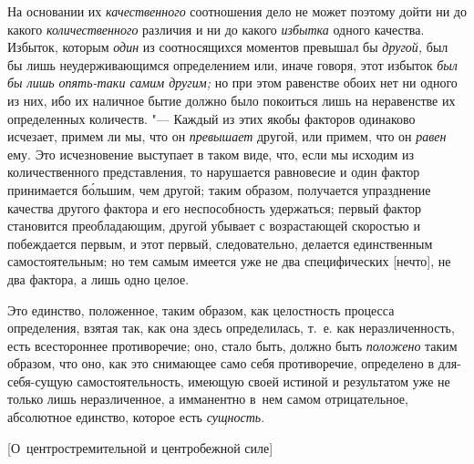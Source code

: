 На основании их {\em качественного} соотношения дело не может поэтому дойти ни
до какого {\em количественного} различия и ни до какого {\em избытка} одного
качества. Избыток, которым {\em один} из соотносящихся моментов превышал бы
{\em другой,} был бы лишь неудерживающимся определением или, иначе говоря, этот
избыток {\em был бы лишь опять-таки самим другим;} но при этом равенстве обоих
нет ни одного из них, ибо их наличное бытие должно было покоиться лишь на
неравенстве их определенных количеств. "--- Каждый из этих якобы факторов
одинаково исчезает, примем ли мы, что он {\em превышает} другой, или примем,
что он {\em равен} ему. Это исчезновение выступает в таком виде, что, если мы
исходим из количественного представления, то нарушается равновесие и один
фактор принимается б\'{о}льшим, чем другой; таким образом, получается
упразднение качества другого фактора и его неспособность удержаться; первый
фактор становится преобладающим, другой убывает с возрастающей скоростью и
побеждается первым, и этот первый, следовательно, делается единственным
самостоятельным; но тем самым имеется уже не два специфических [нечто], не два
фактора, а лишь одно целое.

Это единство, положенное, таким образом, как целостность процесса определения,
взятая так, как она здесь определилась, т.~е. как неразличенность, есть
всестороннее противоречие; оно, стало быть, должно быть {\em положено} таким
образом, что оно, как это снимающее само себя противоречие, определено в
для-себя-сущую самостоятельность, имеющую своей истиной и результатом уже не
только лишь неразличенное, а имманентно в~нем самом отрицательное, абсолютное
единство, которое есть {\em сущность}.

%
{[О~центростремительной и центробежной силе]}

